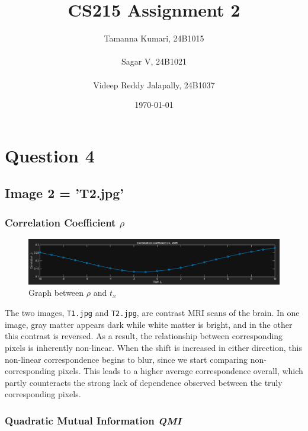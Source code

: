\documentclass{report}
\title{\Huge CS215 Assignment 2}
\author{Tamanna Kumari, 24B1015
\\\\Sagar V, 24B1021
\\\\Videep Reddy Jalapally, 24B1037}
\date{\today}
\begin{document}
\maketitle
\tableofcontents
\newpage

\section*{Question 4}

\subsection*{Image 2 = 'T2.jpg'}

\subsubsection*{Correlation Coefficient \boldmath$\rho$}

\begin{figure}[h]
    \centering
    \includegraphics[width=\textwidth]{q4_0_corr.png}
    \caption{Graph between $\rho$ and $t_x$}
\end{figure}

The two images, \texttt{T1.jpg} and \texttt{T2.jpg}, are contrast MRI scans of the brain. In one image, gray matter appears dark while white matter is bright, and in the other this contrast is reversed. As a result, the relationship between corresponding pixels is inherently non-linear. When the shift is increased in either direction, this non-linear correspondence begins to blur, since we start comparing non-corresponding pixels. This leads to a higher average correspondence overall, which partly counteracts the strong lack of dependence observed between the truly corresponding pixels.

\vspace{1em}

\subsubsection*{Quadratic Mutual Information \textit{QMI}}
\end{document}
